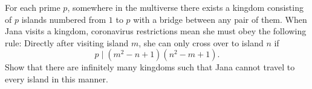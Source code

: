 For each prime $p$, somewhere in the multiverse there exists a kingdom consisting of $p$ islands
numbered from $1$ to $p$ with a bridge between any pair of them.
When Jana visits a kingdom, coronavirus restrictions mean she must obey the following rule:
Directly after visiting island $m$, she can only cross over to island $n$ if 
$$p \mid (m^2-n+1)(n^2-m+1).$$
Show that there are infinitely many kingdoms such that Jana cannot travel to every island in this manner.
